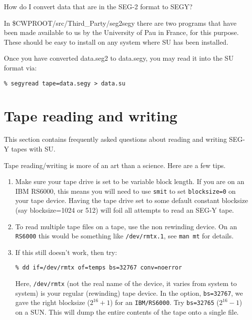 {{{{{{{\begin{question}
How do I convert data that are in the SEG-2 format to SEGY?
\end{question}

\begin{rmans}
In \$CWPROOT/src/Third\_Party/seg2segy   there are two programs
that have been made available to us by the University of Pau
in France, for this purpose. These should be easy to install
on any system where {\small\sf SU} has been installed.

Once you have converted   data.seg2  to  data.segy, you may
read it into the {\small\sf SU} format via:

{\small \begin{verbatim}
% segyread tape=data.segy > data.su
\end{verbatim}} \noindent
\end{rmans}

\section{Tape reading and writing}
This section contains frequently asked questions about reading
and writing {\sf SEG-Y} tapes with {\small\sf SU}.

\noindent Tape reading/writing is more of an art than a science.
Here are a few tips. 
\begin{enumerate}
\item Make sure your tape drive is set to be variable block
    length. If you are on an {\sf IBM RS6000}, this means you
    will need to use {\tt smit} to set {\tt blocksize=0} on your tape
    device. Having the tape drive set to some default
    constant blocksize (say blocksize=1024 or 512)
    will foil all attempts to read an {\sf SEG-Y} tape.
\item To read multiple tape files on a tape, use the non
     rewinding device. On an {\tt RS6000} this would be
      something like {\tt /dev/rmtx.1}, see {\tt man mt} for details.
\item If this still doesn't work, then try:
{\small \begin{verbatim}
% dd if=/dev/rmtx of=temps bs=32767 conv=noerror
\end{verbatim}}\noindent
Here, {\tt /dev/rmtx} (not the real name of the device,
it varies from system
to system) is your regular (rewinding) tape device.
In the option, {\tt bs=32767}, we gave the right blocksize ($2^{16}+1$)
for an {\tt IBM/RS6000}.  Try
\verb:bs=32765:  ($2^{16}-1$) on a {\sf SUN}. 
This will dump the entire contents of the tape onto
a single file.
\end{enumerate}


}}}}}}}
